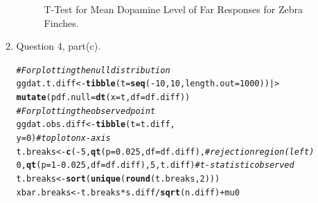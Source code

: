 \documentclass{article}\usepackage[]{graphicx}\usepackage[]{xcolor}
\makeatletter
\newcommand{\hlnum}[1]{\textcolor[rgb]{0.686,0.059,0.569}{#1}}%
\newcommand{\hlcom}[1]{\textcolor[rgb]{0.678,0.584,0.686}{\textit{#1}}}%
\newcommand{\hlopt}[1]{\textcolor[rgb]{0,0,0}{#1}}%
\newcommand{\hldef}[1]{\textcolor[rgb]{0.345,0.345,0.345}{#1}}%
\newcommand{\hlkwb}[1]{\textcolor[rgb]{0.69,0.353,0.396}{#1}}%
\newcommand{\hlkwc}[1]{\textcolor[rgb]{0.333,0.667,0.333}{#1}}%
\newcommand{\hlkwd}[1]{\textcolor[rgb]{0.737,0.353,0.396}{\textbf{#1}}}%
\newenvironment{kframe}{%
 \def\at@end@of@kframe{}%
 \ifinner\ifhmode%
  \def\at@end@of@kframe{\end{minipage}}%
  \begin{minipage}{\columnwidth}%
 \fi\fi%
 \def\FrameCommand##1{\hskip\@totalleftmargin \hskip-\fboxsep
 \colorbox{shadecolor}{##1}\hskip-\fboxsep
     \hskip-\linewidth \hskip-\@totalleftmargin \hskip\columnwidth}%
 \MakeFramed {\advance\hsize-\width
   \@totalleftmargin\z@ \linewidth\hsize
   \@setminipage}}%
 {\par\unskip\endMakeFramed%
 \at@end@of@kframe}
\newenvironment{knitrout}{}{} %
\makeatother
\begin{document}
\begin{enumerate}
\begin{enumerate}
\begin{figure}[H]
\begin{knitrout}
\end{knitrout}
\caption{T-Test for Mean Dopamine Level of Far Responses for Zebra Finches.}
\end{figure}
  \item Question 4, part(c).
\begin{knitrout}\scriptsize
{}\color{fgcolor}\begin{kframe}
\begin{alltt}
\hlcom{# For plotting the null distribution}
\hldef{ggdat.t.diff} \hlkwb{<-} \hlkwd{tibble}\hldef{(}\hlkwc{t}\hldef{=}\hlkwd{seq}\hldef{(}\hlopt{-}\hlnum{10}\hldef{,}\hlnum{10}\hldef{,}\hlkwc{length.out}\hldef{=}\hlnum{1000}\hldef{))|>}
\hlkwd{mutate}\hldef{(}\hlkwc{pdf.null} \hldef{=} \hlkwd{dt}\hldef{(}\hlkwc{x}\hldef{=t,} \hlkwc{df}\hldef{=df.diff))}
\hlcom{# For plotting the observed point}
\hldef{ggdat.obs.diff} \hlkwb{<-} \hlkwd{tibble}\hldef{(}\hlkwc{t} \hldef{= t.diff,}
                      \hlkwc{y} \hldef{=} \hlnum{0}\hldef{)} \hlcom{# to plot on x-axis}
\hldef{t.breaks} \hlkwb{<-} \hlkwd{c}\hldef{(}\hlopt{-}\hlnum{5}\hldef{,} \hlkwd{qt}\hldef{(}\hlkwc{p} \hldef{=} \hlnum{0.025}\hldef{,} \hlkwc{df} \hldef{= df.diff),} \hlcom{# rejection region (left)}
            \hlnum{0}\hldef{,} \hlkwd{qt}\hldef{(}\hlkwc{p} \hldef{=} \hlnum{1}\hlopt{-}\hlnum{0.025}\hldef{,} \hlkwc{df} \hldef{= df.diff),} \hlnum{5}\hldef{, t.diff)}                  \hlcom{# t-statistic observed}
\hldef{t.breaks} \hlkwb{<-} \hlkwd{sort}\hldef{(}\hlkwd{unique}\hldef{(}\hlkwd{round}\hldef{(t.breaks,} \hlnum{2}\hldef{)))}
\hldef{xbar.breaks} \hlkwb{<-} \hldef{t.breaks} \hlopt{*} \hldef{s.diff}\hlopt{/}\hlkwd{sqrt}\hldef{(n.diff)} \hlopt{+} \hldef{mu0}


\end{alltt}
\end{kframe}
\end{knitrout}
\end{enumerate}
\end{enumerate}
\end{document}
